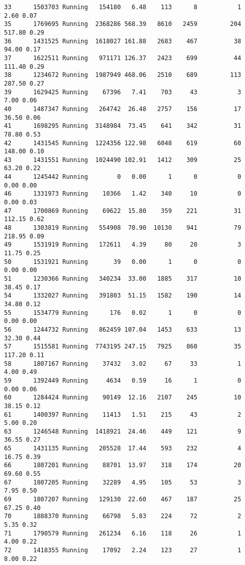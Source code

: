 \documentclass[
]{article}
\begin{document}
\begin{verbatim}
33      1503703 Running   154180   6.48    113      8           1    2.60 0.07
35      1769695 Running  2368286 568.39   8610   2459         204  517.80 0.29
36      1431525 Running  1618027 161.88   2683    467          38   94.00 0.17
37      1622511 Running   971171 126.37   2423    699          44  111.40 0.29
38      1234672 Running  1987949 468.06   2510    689         113  287.50 0.27
39      1629425 Running    67396   7.41    703     43           3    7.00 0.06
40      1487347 Running   264742  26.48   2757    156          17   36.50 0.06
41      1698295 Running  3148984  73.45    641    342          31   78.80 0.53
42      1431545 Running  1224356 122.98   6048    619          60  148.00 0.10
43      1431551 Running  1024490 102.91   1412    309          25   63.20 0.22
44      1245442 Running        0   0.00      1      0           0    0.00 0.00
46      1331973 Running    10366   1.42    340     10           0    0.00 0.03
47      1700869 Running    69622  15.80    359    221          31  112.15 0.62
48      1303819 Running   554908  70.90  10130    941          79  218.95 0.09
49      1531919 Running   172611   4.39     80     20           3   11.75 0.25
50      1531921 Running       39   0.00      1      0           0    0.00 0.00
51      1230366 Running   340234  33.00   1885    317          10   38.45 0.17
54      1332027 Running   391803  51.15   1582    190          14   34.80 0.12
55      1534779 Running      176   0.02      1      0           0    0.00 0.00
56      1244732 Running   862459 107.04   1453    633          13   32.30 0.44
57      1515581 Running  7743195 247.15   7925    860          35  117.20 0.11
58      1807167 Running    37432   3.02     67     33           1    4.00 0.49
59      1392449 Running     4634   0.59     16      1           0    0.00 0.06
60      1284424 Running    90149  12.16   2107    245          10   38.15 0.12
61      1400397 Running    11413   1.51    215     43           2    5.00 0.20
63      1246548 Running  1418921  24.46    449    121           9   36.55 0.27
65      1431135 Running   205528  17.44    593    232           4   16.75 0.39
66      1807201 Running    88701  13.97    318    174          20   69.60 0.55
67      1807205 Running    32289   4.95    105     53           3    7.95 0.50
69      1807207 Running   129130  22.60    467    187          25   67.25 0.40
70      1888370 Running    66798   5.83    224     72           2    5.35 0.32
71      1790579 Running   261234   6.16    118     26           1    4.00 0.22
72      1418355 Running    17092   2.24    123     27           1    8.00 0.22

\end{verbatim}
\end{document}

